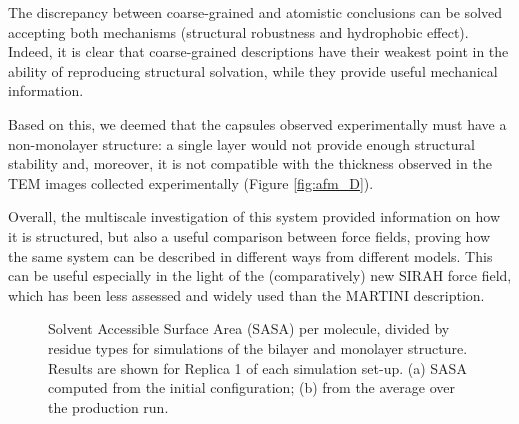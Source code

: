 The discrepancy between coarse-grained and atomistic conclusions can be solved accepting both mechanisms (structural robustness and hydrophobic effect). Indeed, it is clear that coarse-grained descriptions have their weakest point in the ability of reproducing structural solvation, while they provide useful mechanical information.
 
Based on this, we deemed that the capsules observed experimentally must have a non-monolayer structure: a single layer would not provide enough structural stability and, moreover, it is not compatible with the thickness observed in the TEM images collected experimentally (Figure \ref{fig:afm_D}).

Overall, the multiscale investigation of this system provided information on how it is structured, but also a useful comparison between force fields, proving how the same system can be described in different ways from different models. This can be useful especially in the light of the (comparatively) new SIRAH force field, which has been less assessed and widely used than the MARTINI description.
%
\begin{figure}[t!]
\centering
{} 
\caption[SASA per residue of monolayer and bilater]{Solvent Accessible Surface Area (SASA) per molecule, divided by residue types for simulations of the bilayer and monolayer structure. Results are shown for Replica 1 of each simulation set-up. (a) SASA computed from the initial configuration; (b) from the average over the production run.}
\label{fig:mono_bi_sasa}
\end{figure}


